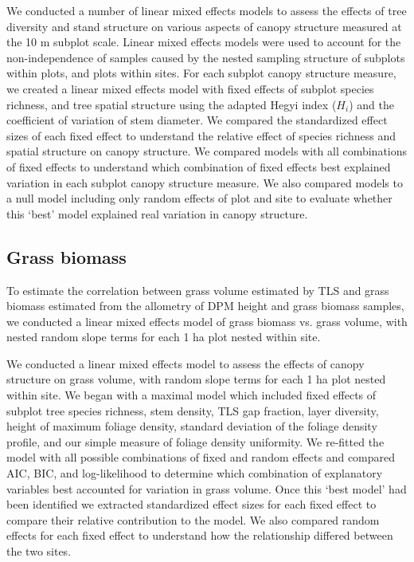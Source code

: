 \documentclass[11pt,a4paper]{article}
\begin{document}
We conducted a number of linear mixed effects models to assess the effects of tree diversity and stand structure on various aspects of canopy structure measured at the 10 m subplot scale. Linear mixed effects models were used to account for the non-independence of samples caused by the nested sampling structure of subplots within plots, and plots within sites. For each subplot canopy structure measure, we created a linear mixed effects model with fixed effects of subplot species richness, and tree spatial structure using the adapted Hegyi index ($H_{i}$) and the coefficient of variation of stem diameter. We compared the standardized effect sizes of each fixed effect to understand the relative effect of species richness and spatial structure on canopy structure. We compared models with all combinations of fixed effects to understand which combination of fixed effects best explained variation in each subplot canopy structure measure. We also compared models to a null model including only random effects of plot and site to evaluate whether this `best' model explained real variation in canopy structure.

\subsection{Grass biomass}

To estimate the correlation between grass volume estimated by TLS and grass biomass estimated from the allometry of DPM height and grass biomass samples, we conducted a linear mixed effects model of grass biomass vs. grass volume, with nested random slope terms for each 1 ha plot nested within site. 

We conducted a linear mixed effects model to assess the effects of canopy structure on grass volume, with random slope terms for each 1 ha plot nested within site. We began with a maximal model which included fixed effects of subplot tree species richness, stem density, TLS gap fraction, layer diversity, height of maximum foliage density, standard deviation of the foliage density profile, and our simple measure of foliage density uniformity. We re-fitted the model with all possible combinations of fixed and random effects and compared AIC, BIC, and log-likelihood to determine which combination of explanatory variables best accounted for variation in grass volume. Once this `best model' had been identified we extracted standardized effect sizes for each fixed effect to compare their relative contribution to the model. We also compared random effects for each fixed effect to understand how the relationship differed between the two sites.
\end{document}
